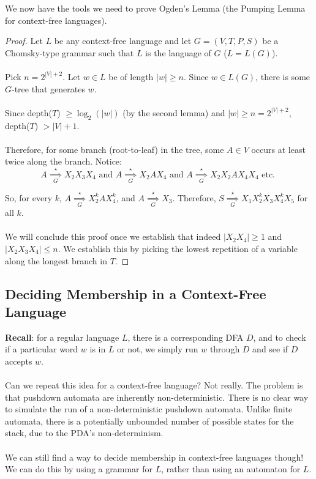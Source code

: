 \documentclass[]{article}
\theoremstyle{definition}
\newcommand{\lecture}[1]{\marginpar{{\footnotesize $\leftarrow$ \underline{#1}}}}
\begin{document}
      We now have the tools we need to prove Ogden's Lemma (the Pumping Lemma for context-free languages).
      \begin{proof}
        Let $L$ be any context-free language and let $G = (V, T, P, S)$ be a Chomsky-type grammar such that $L$ is the language of $G$ ($L = L(G)$).
        \\ \\
        Pick $n = 2^{|V| + 2}$. Let $w \in L$ be of length $|w| \ge n$. Since $w \in L(G)$, there is some $G$-tree that generates $w$.
        \\ \\
        Since depth($T$) $\ge \log_2(|w|)$ (by the second lemma) and $|w| \ge n = 2^{|V| + 2}$, depth($T$) $> |V| + 1$.
        \\ \\
        Therefore, for some branch (root-to-leaf) in the tree, some $A \in V$ occurs at least twice along the branch. Notice:
        $$
          A \underset{G}{\overset{\star}{\implies}} X_2 X_3 X_4 \text{ and } A \underset{G}{\overset{\star}{\implies}} X_2 A X_4 \text{ and } A \underset{G}{\overset{\star}{\implies}} X_2 X_2 A X_4 X_4 \text{ etc. }
        $$

        So, for every $k$, $A \underset{G}{\overset{\star}{\implies}} X_2^k A X_4^k$, and $A \underset{G}{\overset{\star}{\implies}} X_3$. Therefore, $S \underset{G}{\overset{\star}{\implies}} X_1 X_2^k X_3 X_4^k X_5$ for all $k$.
        \\ \\
        We will conclude this proof once we establish that indeed $|X_2 X_4| \ge 1$ and $|X_2 X_3 X_4| \le n$. We establish this by picking the lowest repetition of a variable along the longest branch in $T$.
      \end{proof}

      \subsection{Deciding Membership in a Context-Free Language} \lecture{October 31, 2013}
        \textbf{Recall}: for a regular language $L$, there is a corresponding DFA $D$, and to check if a particular word $w$ is in $L$ or not, we simply run $w$ through $D$ and see if $D$ accepts $w$.
        \\ \\
        Can we repeat this idea for a context-free language? Not really. The problem is that pushdown automata are inherently non-deterministic. There is no clear way to simulate the run of a non-deterministic pushdown automata. Unlike finite automata, there is a potentially unbounded number of possible states for the stack, due to the PDA's non-determinism.
        \\ \\
        We can still find a way to decide membership in context-free languages though! We can do this by using a grammar for $L$, rather than using an automaton for $L$.
\end{document}
